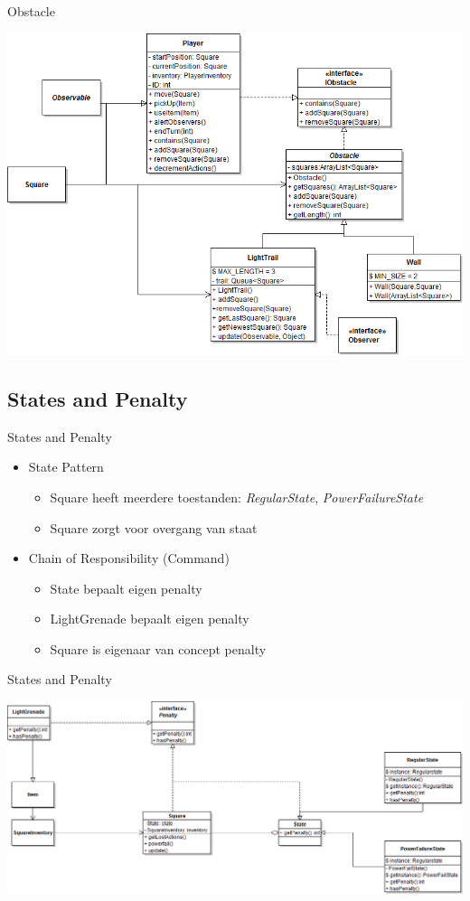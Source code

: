 \documentclass[t]{beamer}
\begin{document}
\begin{frame}{Obstacle}
\begin{center}
\includegraphics[width=0.70\linewidth]{images/obstacleObserverClassDiagram}
\end{center}
\end{frame}

\subsection{States and Penalty}

\begin{frame}{States and Penalty}
\begin{itemize}
	\item State Pattern
	\begin{itemize}
		\item Square heeft meerdere toestanden: \textit{RegularState}, \textit{PowerFailureState}
		\item Square zorgt voor overgang van staat
	\end{itemize}
	\item Chain of Responsibility (Command)
	\begin{itemize}
		\item State bepaalt eigen penalty
		\item LightGrenade bepaalt eigen penalty
		\item Square is eigenaar van concept penalty
	\end{itemize}
\end{itemize}
\end{frame}

\begin{frame}{States and Penalty}
\begin{center}
\includegraphics[width=0.90\linewidth]{images/classDiagramStateAndPanelty}
\end{center}
\end{frame}
\end{document}
